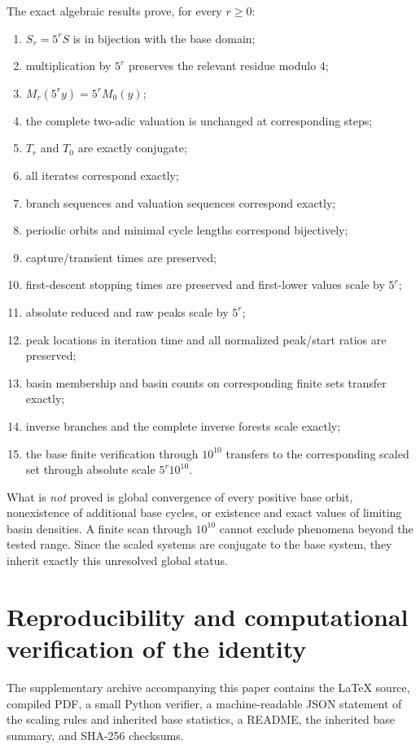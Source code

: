 \documentclass[11pt]{article}
\theoremstyle{remark}
\begin{document}
The exact algebraic results prove, for every $r\ge0$:
\begin{enumerate}[label=(\roman*)]
\item $S_r=5^rS$ is in bijection with the base domain;
\item multiplication by $5^r$ preserves the relevant residue modulo $4$;
\item $M_r(5^ry)=5^rM_0(y)$;
\item the complete two-adic valuation is unchanged at corresponding steps;
\item $T_r$ and $T_0$ are exactly conjugate;
\item all iterates correspond exactly;
\item branch sequences and valuation sequences correspond exactly;
\item periodic orbits and minimal cycle lengths correspond bijectively;
\item capture/transient times are preserved;
\item first-descent stopping times are preserved and first-lower values scale by $5^r$;
\item absolute reduced and raw peaks scale by $5^r$;
\item peak locations in iteration time and all normalized peak/start ratios are preserved;
\item basin membership and basin counts on corresponding finite sets transfer exactly;
\item inverse branches and the complete inverse forests scale exactly;
\item the base finite verification through $10^{10}$ transfers to the corresponding scaled set through absolute scale $5^r10^{10}$.
\end{enumerate}

What is \emph{not} proved is global convergence of every positive base orbit, nonexistence of additional base cycles, or existence and exact values of limiting basin densities.  A finite scan through $10^{10}$ cannot exclude phenomena beyond the tested range.  Since the scaled systems are conjugate to the base system, they inherit exactly this unresolved global status.

\section{Reproducibility and computational verification of the identity}

The supplementary archive accompanying this paper contains the \LaTeX{} source, compiled PDF, a small Python verifier, a machine-readable JSON statement of the scaling rules and inherited base statistics, a README, the inherited base summary, and SHA-256 checksums.
\end{document}
